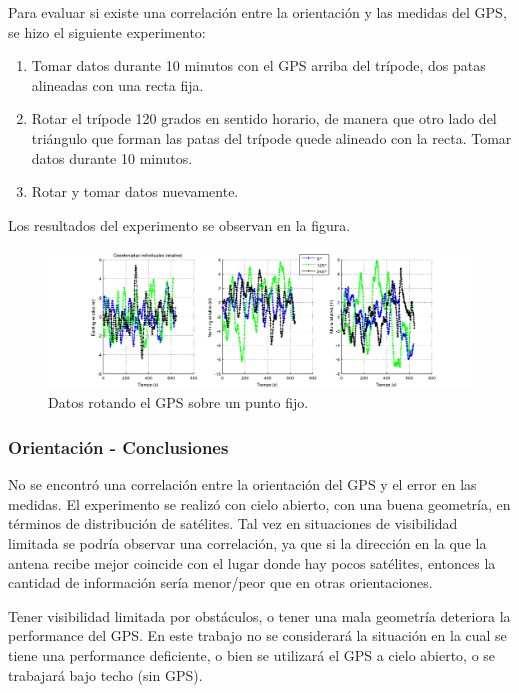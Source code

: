 \documentclass[main]{subfiles}
\begin{document}
Para evaluar si existe una correlación entre la orientación y las medidas del GPS, se hizo el siguiente experimento:
\begin{enumerate}
\item Tomar datos durante 10 minutos con el GPS arriba del trípode, dos patas alineadas con una recta fija.
\item Rotar el trípode 120 grados en sentido horario, de manera que otro lado del triángulo que forman las patas del trípode quede alineado con la recta. Tomar datos durante 10 minutos.
\item Rotar y tomar datos nuevamente.
\end{enumerate}

Los resultados del experimento se observan en la figura.

\begin{figure}[h!]
\hspace{-70pt}
  \includegraphics[width=1.4\textwidth]{./pics_gps/orientacion_individual.png}
  \caption{Datos rotando el GPS sobre un punto fijo.}
  \label{fig:orientacion_individual.png}
\end{figure}

\subsubsection{Orientación - Conclusiones}
\label{sec:orientacion-conclusiones}

No se encontró una correlación entre la orientación del GPS y el error en las medidas.
El experimento se realizó con cielo abierto, con una buena geometría, en términos de distribución de satélites. Tal vez en situaciones de visibilidad limitada se podría observar una correlación, ya que si la dirección en la que la antena recibe mejor coincide con el lugar donde hay pocos satélites, entonces la cantidad de información sería menor/peor que en otras orientaciones.

Tener visibilidad limitada por obstáculos, o tener una mala geometría deteriora la performance del GPS. En este trabajo no se considerar\'a la situaci\'on en la cual se tiene una performance deficiente, o bien se utilizar\'a el GPS a cielo abierto, o se trabajar\'a bajo techo (sin GPS).
\end{document}
